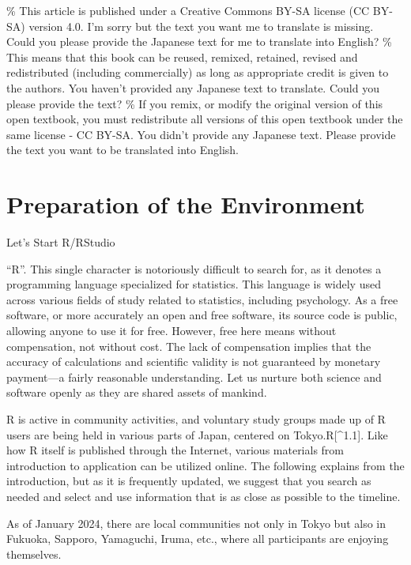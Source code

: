 \documentclass[
  a4paper,
]{book}
\begin{document}
\% This article is published under a Creative Commons BY-SA license (CC
BY-SA) version 4.0. I'm sorry but the text you want me to translate is
missing. Could you please provide the Japanese text for me to translate
into English? \% This means that this book can be reused, remixed,
retained, revised and redistributed (including commercially) as long as
appropriate credit is given to the authors. You haven't provided any
Japanese text to translate. Could you please provide the text? \% If you
remix, or modify the original version of this open textbook, you must
redistribute all versions of this open textbook under the same license -
CC BY-SA. You didn't provide any Japanese text. Please provide the text
you want to be translated into English.


\chapter{Preparation of the
Environment}\label{preparation-of-the-environment}

Let's Start R/RStudio

``R''. This single character is notoriously difficult to search for, as
it denotes a programming language specialized for statistics. This
language is widely used across various fields of study related to
statistics, including psychology. As a free software, or more accurately
an open and free software, its source code is public, allowing anyone to
use it for free. However, free here means without compensation, not
without cost. The lack of compensation implies that the accuracy of
calculations and scientific validity is not guaranteed by monetary
payment---a fairly reasonable understanding. Let us nurture both science
and software openly as they are shared assets of mankind.

R is active in community activities, and voluntary study groups made up
of R users are being held in various parts of Japan, centered on
Tokyo.R{[}\^{}1.1{]}. Like how R itself is published through the
Internet, various materials from introduction to application can be
utilized online. The following explains from the introduction, but as it
is frequently updated, we suggest that you search as needed and select
and use information that is as close as possible to the timeline.

As of January 2024, there are local communities not only in Tokyo but
also in Fukuoka, Sapporo, Yamaguchi, Iruma, etc., where all participants
are enjoying themselves.
\end{document}
